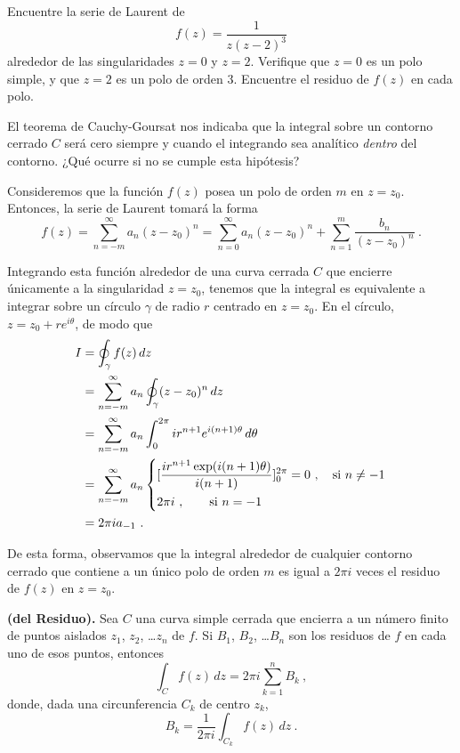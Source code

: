 \begin{ejemplo}
    Encuentre la serie de Laurent de
    \begin{equation*}
        f(z) = \frac{1}{z(z-2)^3} 
    \end{equation*}
    alrededor de las singularidades $z=0$ y $z=2$. Verifique que $z=0$ es un polo simple, y que $z=2$ es un polo de orden 3. Encuentre el residuo de $f(z)$ en cada polo.   
\end{ejemplo}

El teorema de Cauchy-Goursat nos indicaba que la integral sobre un contorno cerrado $C$ será cero siempre y cuando el integrando sea analítico \emph{dentro} del contorno. ¿Qué ocurre si no se cumple esta hipótesis?

Consideremos que la función $f(z)$ posea un polo de orden $m$ en $z = z_0$. Entonces, la serie de Laurent tomará la forma 
\begin{equation*}
    f(z) = \sum_{n=-m}^\infty a_n (z-z_0)^n = \sum_{n=0}^\infty a_n (z-z_0)^n + \sum_{n=1}^m \frac{b_n}{(z-z_0)^n} \ .
\end{equation*}

Integrando esta función alrededor de una curva cerrada $C$ que encierre únicamente a la singularidad $z=z_0$, tenemos que la integral es equivalente a integrar sobre un círculo $\gamma$ de radio $r$ centrado en $z=z_0$. En el círculo, $z = z_0 + r e^{i\theta}$, de modo que 
\begin{align*}
    I & = \oint_\gamma f(z) \, dz \\
    & = \sum_{n=-m}^\infty a_n \oint_\gamma (z-z_0)^n \, dz \\
    & = \sum_{n=-m}^\infty a_n \int_0^{2\pi} i r^{n+1} e^{i(n+1)\theta} \, d\theta \\
    & =  \sum_{n=-m}^\infty a_n \begin{dcases}
        [\dfrac{ir^{n+1}\exp(i(n+1)\theta)}{i(n+1)}]^{2\pi}_0 = 0 \ , \quad \text{si } n \neq -1 \\
        2\pi i \ , \quad \quad \text{si } n = -1
    \end{dcases} \\
    & = 2\pi i a_{-1} \ .
\end{align*}

De esta forma, observamos que la integral alrededor de cualquier contorno cerrado que contiene a un único polo de orden $m$ es igual a $2\pi i$ veces el residuo de $f(z)$ en $z=z_0$.

\begin{teorema}{\textbf{(del Residuo).}}
    Sea $C$ una curva simple cerrada que encierra a un número finito de puntos aislados $z_1$, $z_2$, \dots $z_n$ de $f$. Si $B_1$, $B_2$, \dots $B_n$ son los residuos de $f$ en cada uno de esos puntos, entonces 
    \begin{equation}
        \int_C f(z) \, dz = 2\pi i \sum_{k=1}^n B_k \ ,
    \end{equation}
    donde, dada una circunferencia $C_k$ de centro $z_k$,
    \begin{equation}
        B_k = \frac{1}{2\pi i} \int_{C_k} f(z) \, dz \ .
    \end{equation}
\end{teorema}

